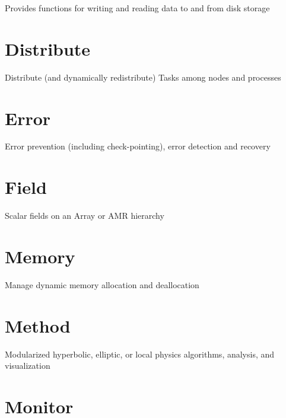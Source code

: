 \documentclass{book}
\begin{document}
Provides functions for writing and reading data to and from disk
storage

\section{Distribute}

Distribute (and dynamically redistribute) Tasks among nodes and
processes

\section{Error}

Error prevention (including check-pointing), error detection and
recovery

\section{Field}

Scalar fields on an Array or AMR hierarchy

\section{Memory}

Manage dynamic memory allocation and deallocation

\section{Method}

Modularized hyperbolic, elliptic, or local physics algorithms,
analysis, and visualization

\section{Monitor}
\end{document}
